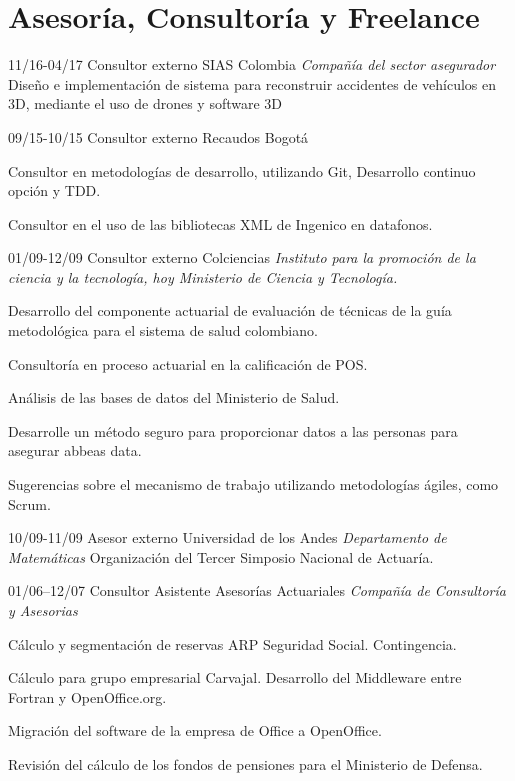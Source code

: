 \section{Asesoría, Consultoría y Freelance}
\begin{entrylist}

  \entry
	{11/16-04/17}
	{Consultor externo}
	{SIAS Colombia {\sl Compañía del sector asegurador}}
	{Diseño e implementación de sistema para reconstruir accidentes de vehículos en 3D,
	mediante el uso de drones y software 3D}

  \entry
	{09/15-10/15}
	{Consultor externo}
	{Recaudos Bogotá}
        {Consultor en metodologías de desarrollo, utilizando Git, Desarrollo continuo
opción y TDD.

	Consultor en el uso de las bibliotecas XML de Ingenico en datafonos.}

  \entry
	{01/09-12/09}
	{Consultor externo}
	{Colciencias {\sl Instituto para la promoción de la ciencia y la tecnología, hoy Ministerio de Ciencia y Tecnología.}}
        {Desarrollo del componente actuarial de evaluación de técnicas de la guía metodológica para
el sistema de salud colombiano.

Consultoría en proceso actuarial en la calificación de POS.

Análisis de las bases de datos del Ministerio de Salud.

Desarrolle un método seguro para proporcionar datos a las personas para asegurar abbeas data.

Sugerencias sobre el mecanismo de trabajo utilizando metodologías ágiles, como Scrum.}

  \entry
	{10/09-11/09}
	{Asesor externo}
	{Universidad de los Andes {\sl Departamento de Matemáticas}}
	{Organización del Tercer Simposio Nacional de Actuaría.}

  \entry
	{01/06–12/07}
	{Consultor Asistente}
	{Asesorías Actuariales {\sl Compañía de Consultoría y Asesorias}}
	{Cálculo y segmentación de reservas ARP Seguridad Social. Contingencia.

Cálculo para grupo empresarial Carvajal. Desarrollo del Middleware
entre Fortran y OpenOffice.org.

Migración del software de la empresa de Office a OpenOffice.

Revisión del cálculo de los fondos de pensiones para el Ministerio de
Defensa.}

\end{entrylist}


